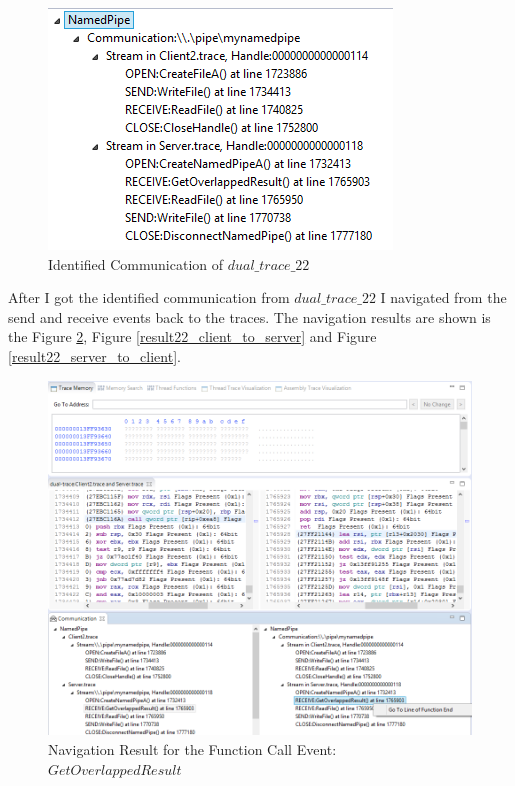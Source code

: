 \begin{figure}[H]
\centerline{\includegraphics[scale=0.55]{Figures/result22_communications}}
 \caption{Identified Communication of $dual\_trace\_22$}
\label{result22_communications}
\end{figure}

After I got the identified communication from $dual\_trace\_22$ I navigated from the send and receive events back to the traces. The navigation results are shown is the Figure \ref{result22_server_readnull}, Figure \ref{result22_client_to_server} and Figure \ref{result22_server_to_client}.

\begin{figure}[H]
\centerline{\includegraphics[scale=0.35]{Figures/result22_server_readnull}}
 \caption{Navigation Result for the Function Call Event: $GetOverlappedResult$}
\label{result22_server_readnull}
\end{figure}

